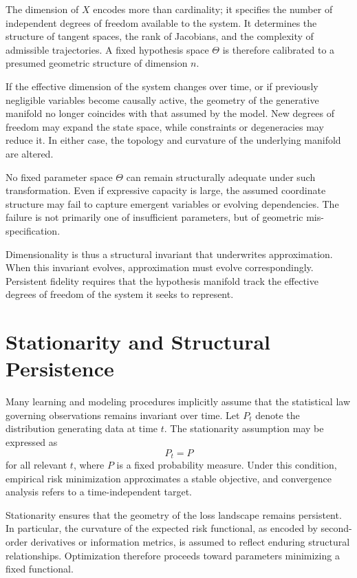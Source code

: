 \documentclass[12pt]{book}
\begin{document}
The dimension of $X$ encodes more than cardinality; it specifies the number of independent degrees of freedom available to the system. It determines the structure of tangent spaces, the rank of Jacobians, and the complexity of admissible trajectories. A fixed hypothesis space $\Theta$ is therefore calibrated to a presumed geometric structure of dimension $n$.

If the effective dimension of the system changes over time, or if previously negligible variables become causally active, the geometry of the generative manifold no longer coincides with that assumed by the model. New degrees of freedom may expand the state space, while constraints or degeneracies may reduce it. In either case, the topology and curvature of the underlying manifold are altered.

No fixed parameter space $\Theta$ can remain structurally adequate under such transformation. Even if expressive capacity is large, the assumed coordinate structure may fail to capture emergent variables or evolving dependencies. The failure is not primarily one of insufficient parameters, but of geometric mis-specification.

Dimensionality is thus a structural invariant that underwrites approximation. When this invariant evolves, approximation must evolve correspondingly. Persistent fidelity requires that the hypothesis manifold track the effective degrees of freedom of the system it seeks to represent.

\section{Stationarity and Structural Persistence}

Many learning and modeling procedures implicitly assume that the statistical law governing observations remains invariant over time. Let $P_t$ denote the distribution generating data at time $t$. The stationarity assumption may be expressed as
\[
P_t = P
\]
for all relevant $t$, where $P$ is a fixed probability measure. Under this condition, empirical risk minimization approximates a stable objective, and convergence analysis refers to a time-independent target.

Stationarity ensures that the geometry of the loss landscape remains persistent. In particular, the curvature of the expected risk functional, as encoded by second-order derivatives or information metrics, is assumed to reflect enduring structural relationships. Optimization therefore proceeds toward parameters minimizing a fixed functional.
\end{document}
